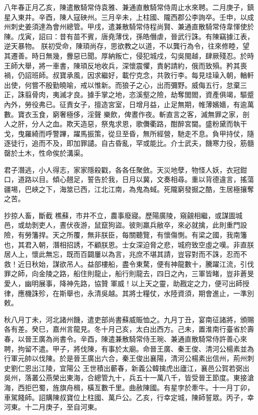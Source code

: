 
\begin{pinyinscope}

 八年春正月乙亥，陳遣散騎常侍袁雅、兼通直散騎常侍周止水來聘。二月庚子，鎮星入東井。辛酉，陳人寇硤州。三月辛未，上柱國、隴西郡公李詢卒。壬申，以成州刺史姜須達為會州總管。甲戌，遣兼散騎常侍程尚賢、兼通直散騎常侍韋惲使於陳。戊寅，詔曰：昔有苗不賓，唐堯薄伐，孫皓僭虐，晉武行誅。有陳竊據江表，逆天暴物。
 朕初受命，陳頊尚存，思欲教之以道，不以龔行為令，往來修睦，望其遷善。時日無幾，釁惡已聞。厚納叛亡，侵犯城戍，勾吳閩越，肆厥殘忍。於時王師大舉，將一車書，陳頊反地收兵，深懷震懼，責躬請約，俄而致殞。矜其喪禍，仍詔班師。叔寶承風，因求繼好，載佇克念，共敦行李。每見珪璪入朝，輶軒出使，何嘗不殷勤曉喻，戒以惟新。而狼子之心，出而彌野。威侮五行，怠棄三正，誅翦骨肉，夷滅才良。據手掌之地，恣溪壑之險，劫奪閭閻，資產俱竭，驅蹙內外，勞役弗已。征責女子，擅造宮室，日增月益，止足無期，帷薄嬪嬙，有逾萬數。寶衣玉食，窮奢極侈，淫聲
 樂飲，俾晝作夜。斬直言之客，滅無罪之家，剖人之肝，分人之血。欺天造惡，祭鬼求恩，歌儛衢路，酣醉宮閫。盛粉黛而執干戈，曳羅綺而呼警蹕，躍馬振策，從旦至昏，無所經營，馳走不息。負甲持仗，隨逐徒行，追而不及，即加罪譴。自古昏亂，罕或能比。介士武夫，饑寒力役，筋髓罄於土木，性命俟於溝渠。



 君子潛逃，小人得志，家家隱殺戳，各各任聚斂。天災地孽，物怪人妖，衣冠鉗口，道路以目。傾心翹足，誓告於我，日月以冀，文奏相尋。重以背德違言，搖蕩疆埸，巴峽之下，海筮已西，江北江南，為鬼為蜮。死隴窮發掘之酷，生居極攘奪之苦。



 抄掠人畜，斷截
 樵蘇，市井不立，農事廢寢。歷陽廣陵，窺覦相繼，或謀圖城邑，或劫剝吏人，晝伏夜游，鼠竄狗盜。彼則羸兵敝卒，來必就擒，此則重門設險，有勞籓捍。天之所覆，無非朕臣，每關聽覽，有懷傷惻。有梁之國，我南籓也，其君入朝，潛相招誘，不顧朕恩。士女深迫脅之悲，城府致空虛之嘆。非直朕居人上，懷此無忘，既而百闢屢以為言，兆庶不堪其請，豈容對而不誅，忍而不救！近日秋始，謀欲吊人。益部樓船，盡令東騖，便有神龍數十，騰躍江流，引伐罪之師，向金陵之路，船住則龍止，船行則龍去，四日之內，三軍皆睹，豈非蒼旻愛人，幽明展事，降神先路，協贊
 軍威！以上天之靈，助戡定之力，便可出師授律，應機誅殄，在斯舉也，永清吳越。其將士糧仗，水陸資須，期會進止，一準別敕。



 秋八月丁未，河北諸州饑，遣吏部尚書蘇威賑恤之。九月丁丑，宴南征諸將，頒賜各有差。癸巳，嘉州言龍見。冬十月己亥，太白出西方。己未，置淮南行臺省於壽春，以晉王廣為尚書令。辛酉，陳遣兼散騎常侍王琬、兼通直散騎常侍許善心來聘，拘留不遣。甲子，將伐陳，有事於太廟。命晉王廣、秦王俊、清河公楊素並為行軍元帥以伐陳。於是晉王廣出六合，秦王俊出襄陽，清河公楊素出信州，荊州刺史劉仁恩出江陵，宜陽公
 王世積出蘄春，新義公韓擒虎出廬江，襄邑公賀若弼出吳州，落叢公燕榮出東海，合總管九十，兵五十一萬八千，皆受晉王節度。東接滄海，西拒巴蜀，旌旗舟楫，橫亙數千里。曲赦陳國。有星孛於牽牛。十一月丁卯，車駕餞師。詔購陳叔寶位上柱國、萬戶公。乙亥，行幸定城，陳師誓眾。丙子，幸河東。十二月庚子，至自河東。




\end{pinyinscope}
